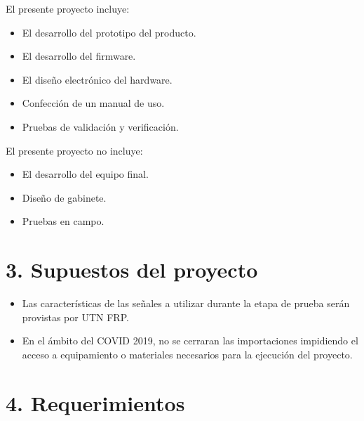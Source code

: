 \documentclass[11pt]{charter}
\begin{document}
El presente proyecto incluye:
\begin{itemize}
\item El desarrollo del prototipo del producto.
\item El desarrollo del firmware.
\item El diseño electrónico del hardware.
\item Confección de un manual de uso.
\item Pruebas de validación y verificación.
\end{itemize}

El presente proyecto no incluye:
\begin{itemize}
\item El desarrollo del equipo final.
\item Diseño de gabinete.
\item Pruebas en campo.
\end{itemize}


\section{3. Supuestos del proyecto}
\label{sec:supuestos}

\begin{itemize}
\item Las características de las señales a utilizar durante la etapa de prueba serán provistas por UTN FRP.
\item En el ámbito del COVID 2019, no se cerraran las importaciones impidiendo el acceso a equipamiento o materiales necesarios para la ejecución del proyecto.
\end{itemize}

\section{4. Requerimientos}
\label{sec:requerimientos}
\end{document}
